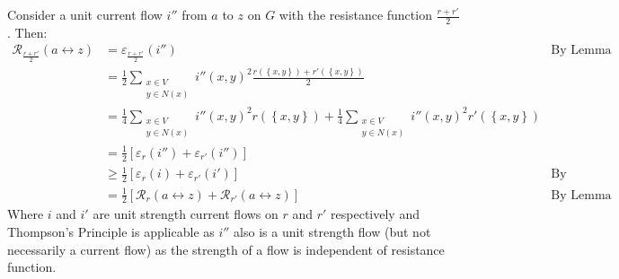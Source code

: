 \documentclass[a4paper, 11pt]{article}
\def\set#1{\left\{ #1 \right\}}
\begin{document}
Consider a unit current flow $i''$ from $a$ to $z$ on $G$ with the resistance function $\frac{r+r'}2$. Then:
\begin{align*}
	\mathcal{R}_{\frac{r+r'}2}(a\leftrightarrow z)
	 & = \varepsilon_{\frac{r+r'}2}(i'') &\text{By Lemma 3.29} \\
	 & = \frac 12 \sum_{\substack{x\in V\\ y\in N(x)}} i''(x,y)^2 \frac{r(\set{x,y})+r'(\set{x,y})}{2} \\
	 & = \frac 14 \sum_{\substack{x\in V\\ y\in N(x)}} i''(x,y)^2 r(\set{x,y})
	   + \frac 14 \sum_{\substack{x\in V\\ y\in N(x)}} i''(x,y)^2 r'(\set{x,y})\\
	 & = \frac12 \left[ \varepsilon_{r}(i'') + \varepsilon_{r'}(i'') \right]\\
	 & \geq \frac12 \left[ \varepsilon_{r}(i) + \varepsilon_{r'}(i') \right] &\text{By Thompson's Principle}\\
	 & = \frac12 \left[ 
	   \mathcal{R}_{r}(a\leftrightarrow z) 
	 + \mathcal{R}_{r'}(a\leftrightarrow z) 
	 \right]&\text{By Lemma 3.29}
\end{align*}
Where $i$ and $i'$ are unit strength current flows on $r$ and $r'$ respectively and Thompson's Principle is applicable as $i''$ also is a unit strength flow (but not necessarily a current flow) as the strength of a flow is independent of resistance function. 
\end{document}
